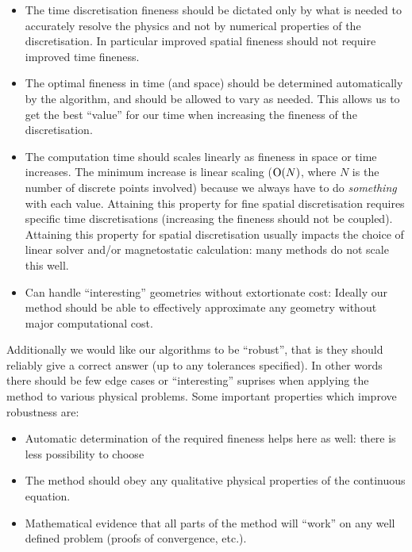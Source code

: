 \begin{itemize}
\item The time discretisation fineness should be dictated only by what is needed to accurately resolve the physics and not by numerical properties of the discretisation.
  In particular improved spatial fineness should not require improved time fineness.

\item The optimal fineness in time (and space) should be determined automatically by the algorithm, and should be allowed to vary as needed.
  This allows us to get the best ``value'' for our time when increasing the fineness of the discretisation.

\item The computation time should scales linearly as fineness in space or time increases.
  The minimum increase is linear scaling ($\text{O}{\left( N \right)}$, where $N$ is the number of discrete points involved) because we always have to do \emph{something} with each value.
  Attaining this property for fine spatial discretisation requires specific time discretisations (\ie increasing the fineness should not be coupled).
  Attaining this property for spatial discretisation usually impacts the choice of linear solver and/or magnetostatic calculation: many methods do not scale this well.

\item Can handle ``interesting'' geometries without extortionate cost:
  Ideally our method should be able to effectively approximate any geometry without major computational cost.
\end{itemize}

Additionally we would like our algorithms to be ``robust'', that is they should reliably give a correct answer (up to any tolerances specified).
In other words there should be few edge cases or ``interesting'' suprises when applying the method to various physical problems.
Some important properties which improve robustness are:
\begin{itemize}
\item Automatic determination of the required fineness helps here as well: there is less possibility to choose 

\item The method should obey any qualitative physical properties of the continuous equation. 

\item Mathematical evidence that all parts of the method will ``work'' on any well defined problem (\eg proofs of convergence, etc.).
\end{itemize}

